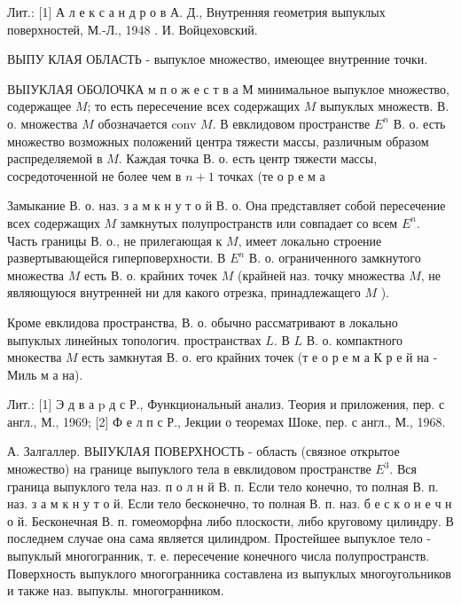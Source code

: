 \documentclass[10pt]{article}
\begin{document}
Лит.: [1] А л е к с а н д р о в А. Д., Внутренняя геометрия выпуклых поверхностей, М.-Л., 1948 . И. Войцеховский.



ВЫПУ КЛАЯ ОБЛАСТЬ - выпуклое множество, имеющее внутренние точки.



ВЫІУКЛАЯ ОБОЛОЧКА м п о ж е с т в а М минимальное выпуклое множество, содержащее $M$; то есть пересечение всех содержащих $M$ выпуклых множеств. В. о. множества $M$ обозначается conv $M$. В евклидовом пространстве $E^{n}$ В. о. есть множество возможных положений центра тяжести массы, различным образом распределяемой в $M$. Каждая точка В. о. есть центр тяжести массы, сосредоточенной не более чем в $n+1$ точках (те о р е м а



Замыкание В. о. наз. з а м к н у т о й В. о. Она представляет собой пересечение всех содержащих $M$ замкнутых полупространств или совпадает со всем $E^{n}$. Часть границы В. о., не прилегающая к $M$, имеет локально строение развертывающейся гиперповерхности. В $E^{n}$ В. о. ограниченного замкнутого множества $M$ есть В. о. крайних точек $M$ (крайней наз. точку множества $M$, не являющуюся внутренней ни для какого отрезка, принадлежащего $M$ ).



Кроме евклидова пространства, В. о. обычно рассматривают в локально выпуклых линейных топологич. пространствах $L$. В $L$ В. о. компактного мнокества $M$ есть замкнутая В. о. его крайних точек (т е о р е м а К р е й на - Миль м а на).



Лит.: [1] Э д в а p д с Р., Функциональный анализ. Теория и приложения, пер. с англ., М., 1969; [2] Ф е л п с Р., Јекции о теоремах Шоке, пер. с англ., М., 1968.



А. Залгаллер. ВЫІУКЛАЯ ПОВЕРХНОСТЬ - область (связное открытое множество) на границе выпуклого тела в евклидовом пространстве $E^{3}$. Вся граница выпуклого тела наз. п о л н й В. п. Если тело конечно, то полная В. п. наз. з а м к н у т о й. Если тело бесконечно, то полная В. п. наз. б е с к о н е ч н о й. Бесконечная В. п. гомеоморфна либо плоскости, либо круговому цилиндру. В последнем случае она сама является цилиндром. Простейшее выпуклое тело - выпуклый многогранник, т. е. пересечение конечного числа полупространств. Поверхность выпуклого многогранника составлена из выпуклых многоугольников и также наз. выпуклы. многогранником.
\end{document}
